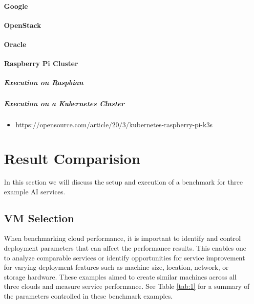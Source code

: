 \hypertarget{google}{%
\paragraph{Google}\label{google}}

\hypertarget{openstack}{%
\paragraph{OpenStack}\label{openstack}}

\hypertarget{oracle}{%
\paragraph{Oracle}\label{oracle}}

\hypertarget{raspberry-pi-cluster}{%
\paragraph{Raspberry Pi Cluster}\label{raspberry-pi-cluster}}

\hypertarget{execution-on-raspbian}{%
\subparagraph{Execution on Raspbian}\label{execution-on-raspbian}}

\hypertarget{execution-on-a-kubernetes-cluster}{%
\subparagraph{Execution on a Kubernetes
Cluster}\label{execution-on-a-kubernetes-cluster}}

\begin{itemize}
\tightlist
\item
  \url{https://opensource.com/article/20/3/kubernetes-raspberry-pi-k3s}
\end{itemize}

\section{Result Comparision}\label{result-comparision}

In this section we will discuss the setup and execution of a benchmark
for three example AI services.

\subsection{VM Selection}\label{vm-selection}

When benchmarking cloud performance, it is important to identify and
control deployment parameters that can affect the performance results.
This enables one to analyze comparable services or identify
opportunities for service improvement for varying deployment features
such as machine size, location, network, or storage hardware. These
examples aimed to create similar machines across all three clouds and
measure service performance. See Table \ref{tab:1} for a summary of the parameters
controlled in these benchmark examples.

